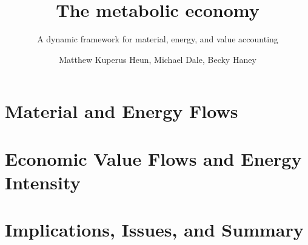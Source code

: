 \documentclass[graybox,envcountchap,sectrefs]{svmono}
\begin{document}
\author{Matthew Kuperus Heun, Michael Dale, Becky Haney}
\title{The metabolic economy}
\subtitle{A dynamic framework for material, energy, and value accounting}
\maketitle{}

\frontmatter%

%
%
%
%

\tableofcontents{}
\listoffigures{}
\listoftables{}
\printnomenclature{}   %

%


\mainmatter%



\part{Material and Energy Flows}







\part{Economic Value Flows and Energy Intensity}

 

 

\part{Implications, Issues, and Summary}







\appendix












\backmatter%
%
%
\printindex{}

\end{document}
